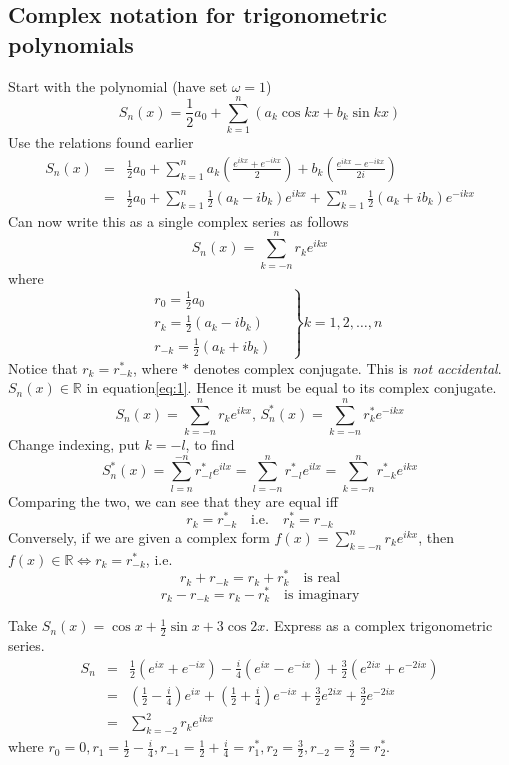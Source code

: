 \documentclass[12pt]{report}
\theoremstyle{definition}
\begin{document}
\subsection{Complex notation for trigonometric polynomials}
Start with the polynomial (have set $\omega = 1$)\[
    S_n(x) = \frac{1}{2}a_0 + \sum_{k=1}^{n} (a_k \cos{kx} + b_k \sin{kx})
\] Use the relations found earlier
\begin{eqnarray*}
    S_n(x) &=& \frac{1}{2}a_0 + \sum_{k=1}^{n} a_k \left(\frac{e^{ikx} + e^{-ikx}}{2}\right) 
            + b_k \left(\frac{e^{ikx} - e^{-ikx}}{2i}\right) \\
           &=& \frac{1}{2}a_0 + \sum_{k=1}^{n} \frac{1}{2}(a_k - ib_k)e^{ikx} + 
           \sum_{k=1}^{n} \frac{1}{2}(a_k + ib_k)e^{-ikx}
\end{eqnarray*}
Can now write this as a single complex series as follows
\begin{equation}
    S_n(x) = \sum_{k = -n}^{n} r_k e^{ikx} \label{eq:1}
\end{equation}
where\[
\left.
    \begin{align*}
        & r_0 = \frac{1}{2} a_0 \\
        & r_k = \frac{1}{2} (a_k - ib_k) \\
        & r_{-k} = \frac{1}{2} (a_k + ib_k)
    \end{align*}
\quad\right\} k = 1,2,\ldots,n
\]
Notice that $r_k = r_{-k}^*$, where $*$ denotes complex conjugate.
This is \emph{not accidental}. $S_n(x) \in \mathbb{R}$ in equation\eqref{eq:1}.
Hence it must be equal to its complex conjugate.\[
    S_n(x) = \sum_{k=-n}^{n} r_k e^{ikx}, \, S_n^*(x) = \sum_{k=-n}^{n} r_k^{*}e^{-ikx}
\]Change indexing, put $k = -l$, to find\[
S_n^*(x) = \sum_{l=n}^{-n} r_{-l}^{*} e^{ilx} = \sum_{l=-n}^{n} r_{-l}^{*}e^{ilx}
= \sum_{k=-n}^{n} r_{-k}^{*} e^{ikx}
\]
Comparing the two, we can see that they are equal iff \[
    r_k = r_{-k}^{*} \quad \text{i.e.} \quad r_k^{*} = r_{-k}
\]
Conversely, if we are given a complex form $f(x) = \sum_{k=-n}^{n} r_k e^{ikx}$,
then $f(x) \in \mathbb{R} \iff r_k = r_{-k}^{*}$, i.e. \[
    r_k + r_{-k} = r_k + r_k^{*} \quad \text{is real}
\]\[
r_k - r_{-k} = r_k - r_k^{*} \quad \text{is imaginary}
\]
\begin{ex}
    Take $S_n(x) = \cos{x} + \frac{1}{2} \sin{x} + 3\cos{2x}$. Express as a complex trigonometric series.
    \begin{eqnarray*}
        S_n &=& \frac{1}{2}(e^{ix} + e^{-ix}) - \frac{i}{4} (e^{ix} - e^{-ix}) + \frac{3}{2} (e^{2ix} + e^{-2ix}) \\
            &=& \left(\frac{1}{2} - \frac{i}{4}\right) e^{ix} + \left(\frac{1}{2} + \frac{i}{4}\right) e^{-ix}
            + \frac{3}{2}e^{2ix} + \frac{3}{2}e^{-2ix} \\
            &=& \sum_{k=-2}^{2} r_k e^{ikx}
    \end{eqnarray*}
    where $r_0 = 0, r_1 = \frac{1}{2} - \frac{i}{4}, r_{-1} = \frac{1}{2} + \frac{i}{4} = r_1^{*},
    r_2 = \frac{3}{2}, r_{-2} = \frac{3}{2} = r_2^{*}$.
\end{ex}
\end{document}
